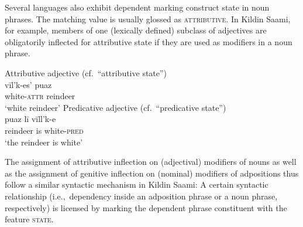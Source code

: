 Several languages also exhibit dependent marking construct state in noun phrases. The matching value is usually glossed as \textsc{attributive}. In Kildin Saami, for example, members of one (lexically defined) subclass of adjectives are obligatorily inflected for attributive state if they are used as modifiers in a noun phrase.
\begin{exe}
\ex\label{state np kildin}
\begin{xlist}
\ex	
\rm{Attributive adjective (cf.~“attributive state”)}\\
\gll 	vīl'k-es'		puaz\\
	white-\textsc{attr}	reindeer\\
\glt 	‘white reindeer’
\ex	
\rm{Predicative adjective (cf.~“predicative state”)}\\
\gll	puaz lī vīll'k-e\\
	reindeer is white-\textsc{pred}\\
\glt	‘the reindeer is white’
\end{xlist}
\end{exe}
The assignment of attributive inflection on (adjectival) modifiers of nouns as well as the assignment of genitive inflection on (nominal) modifiers of adpositions thus follow a similar syntactic mechanism in Kildin Saami: A certain syntactic relationship (i.e.,~dependency inside an adposition phrase or a noun phrase, respectively) is licensed by marking the dependent phrase constituent with the feature \textsc{state}.

